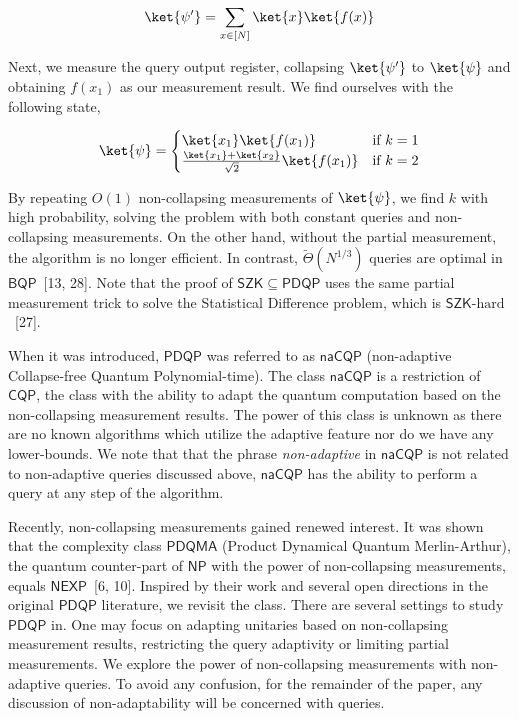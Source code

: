 \[\begin{gathered}
\displaystyle\ket{\psi^{\prime}}=\sum_{x\in[N]}\ket{x}\ket{f(x)}
\end{gathered}\]


Next, we measure the query output register, collapsing $\ket{\psi^{\prime}}$ to $\ket{\psi}$ and obtaining $f(x_{1})$ as our measurement result. We find ourselves with the following state,\par


\[\begin{gathered}
\displaystyle\ket{\psi}=\begin{cases}\ket{x_{1}}\ket{f(x_{1})}&\text{if }k=1\\
\frac{\ket{x_{1}}+\ket{x_{2}}}{\sqrt{2}}\ket{f(x_{1})}&\text{if }k=2\end{cases}
\end{gathered}\]




By repeating $O(1)$ non-collapsing measurements of $\ket{\psi}$, we find $k$ with high probability, solving the problem with both constant queries and non-collapsing measurements. On the other hand, without the partial measurement, the algorithm is no longer efficient. In contrast, $\tilde{\Theta}(N^{1/3})$ queries are optimal in $\mathsf{BQP}$ [13, 28]. Note that the proof of $\mathsf{SZK}\subseteq\mathsf{PDQP}$ uses the same partial measurement trick to solve the Statistical Difference problem, which is $\mathsf{SZK}\text{-hard}$ [27].\par




When it was introduced, $\mathsf{PDQP}$ was referred to as $\mathsf{naCQP}$ (non-adaptive Collapse-free Quantum Polynomial-time). The class $\mathsf{naCQP}$ is a restriction of $\mathsf{CQP}$, the class with the ability to adapt the quantum computation based on the non-collapsing measurement results. The power of this class is unknown as there are no known algorithms which utilize the adaptive feature nor do we have any lower-bounds. We note that that the phrase \emph{non-adaptive} in $\mathsf{naCQP}$ is not related to non-adaptive queries discussed above, $\mathsf{naCQP}$ has the ability to perform a query at any step of the algorithm.\par




Recently, non-collapsing measurements gained renewed interest. It was shown that the complexity class $\mathsf{PDQMA}$ (Product Dynamical Quantum Merlin-Arthur), the quantum counter-part of $\mathsf{NP}$ with the power of non-collapsing measurements, equals $\mathsf{NEXP}$ [6, 10]. Inspired by their work and several open directions in the original $\mathsf{PDQP}$ literature, we revisit the class.
There are several settings to study $\mathsf{PDQP}$ in. One may focus on adapting unitaries based on non-collapsing measurement results, restricting the query adaptivity or limiting partial measurements. We explore the power of non-collapsing measurements with non-adaptive queries. To avoid any confusion, for the remainder of the paper, any discussion of non-adaptability will be concerned with queries.\par




